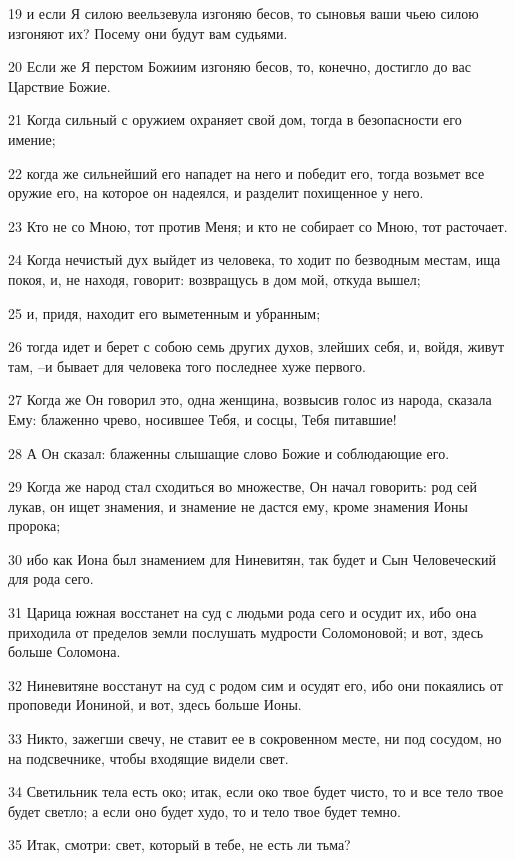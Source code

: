 \par 19 и если Я силою веельзевула изгоняю бесов, то сыновья ваши чьею силою изгоняют их? Посему они будут вам судьями.
\par 20 Если же Я перстом Божиим изгоняю бесов, то, конечно, достигло до вас Царствие Божие.
\par 21 Когда сильный с оружием охраняет свой дом, тогда в безопасности его имение;
\par 22 когда же сильнейший его нападет на него и победит его, тогда возьмет все оружие его, на которое он надеялся, и разделит похищенное у него.
\par 23 Кто не со Мною, тот против Меня; и кто не собирает со Мною, тот расточает.
\par 24 Когда нечистый дух выйдет из человека, то ходит по безводным местам, ища покоя, и, не находя, говорит: возвращусь в дом мой, откуда вышел;
\par 25 и, придя, находит его выметенным и убранным;
\par 26 тогда идет и берет с собою семь других духов, злейших себя, и, войдя, живут там, --и бывает для человека того последнее хуже первого.
\par 27 Когда же Он говорил это, одна женщина, возвысив голос из народа, сказала Ему: блаженно чрево, носившее Тебя, и сосцы, Тебя питавшие!
\par 28 А Он сказал: блаженны слышащие слово Божие и соблюдающие его.
\par 29 Когда же народ стал сходиться во множестве, Он начал говорить: род сей лукав, он ищет знамения, и знамение не дастся ему, кроме знамения Ионы пророка;
\par 30 ибо как Иона был знамением для Ниневитян, так будет и Сын Человеческий для рода сего.
\par 31 Царица южная восстанет на суд с людьми рода сего и осудит их, ибо она приходила от пределов земли послушать мудрости Соломоновой; и вот, здесь больше Соломона.
\par 32 Ниневитяне восстанут на суд с родом сим и осудят его, ибо они покаялись от проповеди Иониной, и вот, здесь больше Ионы.
\par 33 Никто, зажегши свечу, не ставит ее в сокровенном месте, ни под сосудом, но на подсвечнике, чтобы входящие видели свет.
\par 34 Светильник тела есть око; итак, если око твое будет чисто, то и все тело твое будет светло; а если оно будет худо, то и тело твое будет темно.
\par 35 Итак, смотри: свет, который в тебе, не есть ли тьма?
